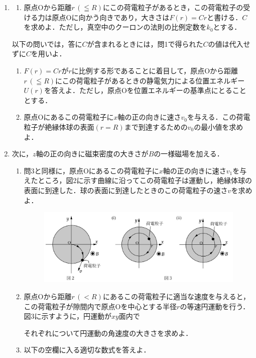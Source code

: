 \begin{enumerate}[label = {〔 \Roman* 〕}]
  \item 
    \begin{enumerate}[label={問\arabic*}]
      \setlength{\itemindent}{1\zw}
      \setlength{\labelsep}{1\zw}
      \setlength{\parindent}{1\zw}
      \item 原点Oから距離$r \, ( \leqq R)$にこの荷電粒子があるとき，この荷電粒子の受ける力は原点Oに向かう向きであり，大きさは$F(r) = Cr$と書ける．$C$を求めよ．ただし，真空中のクーロンの法則の比例定数を$k_0$とする．
    \end{enumerate}

    以下の問いでは，答に$C$が含まれるときには，問1で得られた$C$の値は代入せずに$C$を用いよ．

  \begin{enumerate}[label={問\arabic*}, resume]
      \item $F(r) = Cr$が$r$に比例する形であることに着目して，原点Oから距離$r\, (\leqq R)$にこの荷電粒子があるときの静電気力による位置エネルギー$U(r)$を答えよ．ただし，原点Oを位置エネルギーの基準点にとることとする．
      \item 原点Oにあるこの荷電粒子に$x$軸の正の向きに速さ$v_0$を与える．この荷電粒子が絶縁体球の表面$(r = R)$まで到達するための$v_0$の最小値を求めよ．
    \end{enumerate}
  \item 次に，$z$軸の正の向きに磁束密度の大きさが$B$の一様磁場を加える．
    \begin{enumerate}[label={問\arabic*}, resume]
      \setlength{\itemindent}{1\zw}
      \setlength{\labelsep}{1\zw}
      \setlength{\parindent}{1\zw}

      \item 問3と同様に，原点Oにあるこの荷電粒子に$x$軸の正の向きに速さ$v_1$を与えたところ，図2に示す曲線に沿ってこの荷電粒子は運動し，絶縁体球の表面に到達した．球の表面に到達したときのこの荷電粒子の速さ$v$を求めよ．
      \begin{figure}[H]
        \centering
        \includegraphics[width=11cm]{fig/fig_4_3_2.pdf}
      \end{figure}
      \item 原点Oから距離$r \, (< R)$にあるこの荷電粒子に適当な速度を与えると，この荷電粒子が隙間内で原点Oを中心とする半径$r$の等速円運動を行う．図3に示すように，円運動が$xy$面内で
        それぞれについて円運動の角速度の大きさを求めよ．　
      \item  以下の空欄に入る適切な数式を答えよ．


\end{enumerate}
\end{enumerate}
